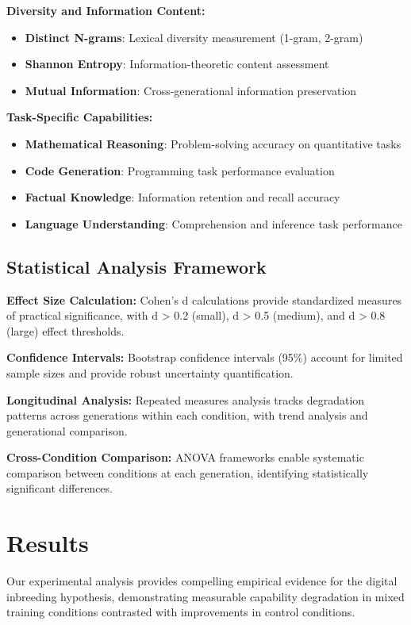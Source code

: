 \documentclass[11pt]{article}
\begin{document}
\textbf{Diversity and Information Content:}
\begin{itemize}
    \item \textbf{Distinct N-grams}: Lexical diversity measurement (1-gram, 2-gram)
    \item \textbf{Shannon Entropy}: Information-theoretic content assessment
    \item \textbf{Mutual Information}: Cross-generational information preservation
\end{itemize}

\textbf{Task-Specific Capabilities:}
\begin{itemize}
    \item \textbf{Mathematical Reasoning}: Problem-solving accuracy on quantitative tasks
    \item \textbf{Code Generation}: Programming task performance evaluation
    \item \textbf{Factual Knowledge}: Information retention and recall accuracy
    \item \textbf{Language Understanding}: Comprehension and inference task performance
\end{itemize}

\subsection{Statistical Analysis Framework}

\textbf{Effect Size Calculation:} Cohen's d calculations provide standardized measures of practical significance, with d > 0.2 (small), d > 0.5 (medium), and d > 0.8 (large) effect thresholds.

\textbf{Confidence Intervals:} Bootstrap confidence intervals (95\%) account for limited sample sizes and provide robust uncertainty quantification.

\textbf{Longitudinal Analysis:} Repeated measures analysis tracks degradation patterns across generations within each condition, with trend analysis and generational comparison.

\textbf{Cross-Condition Comparison:} ANOVA frameworks enable systematic comparison between conditions at each generation, identifying statistically significant differences.

\section{Results}

Our experimental analysis provides compelling empirical evidence for the digital inbreeding hypothesis, demonstrating measurable capability degradation in mixed training conditions contrasted with improvements in control conditions.
\end{document}
